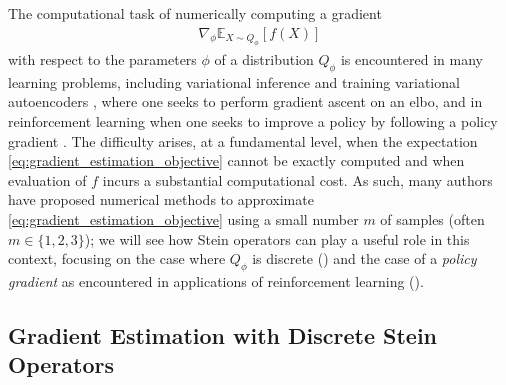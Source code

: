 \documentclass[12pt,paper=letter]{scrreprt}
\begin{document}
The computational task of numerically computing a gradient 
\begin{align}\label{eq:gradient_estimation_objective}
\nabla_\phi \mathbb{E}_{X \sim Q_\phi}[f(X)]    
\end{align}
with respect to the parameters $\phi$ of a distribution $Q_\phi$ is encountered in many learning problems, including variational inference \citep[cf.  and][]{paisley2012variational} and training variational autoencoders \citep[cf.  and][]{Kingma2014}, where one seeks to perform gradient ascent on an \ac{elbo}, and in reinforcement learning when one seeks to improve a policy by following a policy gradient \citep[cf.  and][]{williams1992simple}. 
The difficulty arises, at a fundamental level, when the expectation \cref{eq:gradient_estimation_objective} cannot be exactly computed and when evaluation of $f$ incurs a substantial computational cost.
As such, many authors have proposed numerical methods to approximate \eqref{eq:gradient_estimation_objective} using a small number $m$ of samples (often $m \in \{1,2,3\}$); we will see how Stein operators can play a useful role in this context, focusing on the case where $Q_\phi$ is discrete () and the case of a \emph{policy gradient} as encountered in applications of reinforcement learning ().




\subsection{Gradient Estimation with Discrete Stein Operators}
\label{subsec: discrete gradient}
\end{document}
